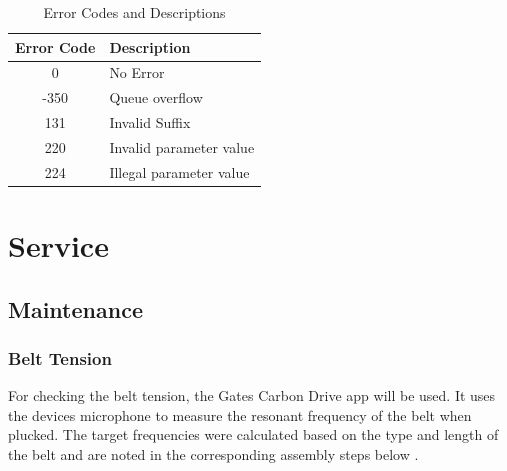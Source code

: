\begin{table}[h!]
\centering
\begin{tabularx}{\textwidth}{|c|X|}
\hline
\textbf{Error Code} & \textbf{Description} \\ \hline
0 & No Error \\ \hline
-350 & Queue overflow \\ \hline
131 & Invalid Suffix \\ \hline
220 & Invalid parameter value \\ \hline
224 & Illegal parameter value \\ \hline
\end{tabularx}
\caption{Error Codes and Descriptions}
\label{tab:error_codes}
\end{table}

\newpage

\section{Service}
\subsection{Maintenance}

\subsubsection{Belt Tension}

For checking the belt tension, the Gates Carbon Drive app \cite{gates_tools_nodate} will be used. It uses the devices microphone to measure the resonant frequency of the belt when plucked. The target frequencies were calculated based on the type and length of the belt and are noted in the corresponding assembly steps below \cite{zoltan_benchtop_2019}. 

\enlargethispage{2\baselineskip}
\vspace{-\baselineskip}

